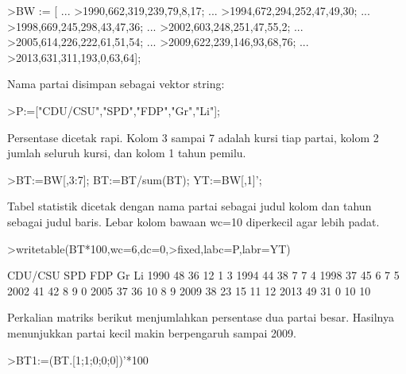 \documentclass[a4paper,10pt]{article}
\begin{document}
\begin{eulernotebook}
\begin{eulercomment}
\begin{eulercomment}
\begin{eulercomment}
\begin{eulercomment}
\begin{eulercomment}
\begin{eulercomment}
\begin{eulercomment}
\begin{eulercomment}
\begin{eulercomment}
\begin{eulercomment}
\begin{eulercomment}
\begin{eulercomment}
\begin{eulercomment}
\begin{eulercomment}
\begin{eulercomment}
\end{eulercomment}
\begin{eulercomment}
\end{eulercomment}
\begin{eulerprompt}
>BW := [ ...
>1990,662,319,239,79,8,17; ...
>1994,672,294,252,47,49,30; ...
>1998,669,245,298,43,47,36; ...
>2002,603,248,251,47,55,2; ...
>2005,614,226,222,61,51,54; ...
>2009,622,239,146,93,68,76; ...
>2013,631,311,193,0,63,64];
\end{eulerprompt}
\begin{eulercomment}
Nama partai disimpan sebagai vektor string:
\end{eulercomment}
\begin{eulerprompt}
>P:=["CDU/CSU","SPD","FDP","Gr","Li"];
\end{eulerprompt}
\begin{eulercomment}
Persentase dicetak rapi. Kolom 3 sampai 7 adalah kursi tiap partai, kolom 2 jumlah seluruh
kursi, dan kolom 1 tahun pemilu.
\end{eulercomment}
\begin{eulerprompt}
>BT:=BW[,3:7]; BT:=BT/sum(BT); YT:=BW[,1]';
\end{eulerprompt}
\begin{eulercomment}
Tabel statistik dicetak dengan nama partai sebagai judul kolom dan tahun sebagai judul
baris. Lebar kolom bawaan wc=10 diperkecil agar lebih padat.
\end{eulercomment}
\begin{eulerprompt}
>writetable(BT*100,wc=6,dc=0,>fixed,labc=P,labr=YT)
\end{eulerprompt}
\begin{euleroutput}
         CDU/CSU   SPD   FDP    Gr    Li
    1990      48    36    12     1     3
    1994      44    38     7     7     4
    1998      37    45     6     7     5
    2002      41    42     8     9     0
    2005      37    36    10     8     9
    2009      38    23    15    11    12
    2013      49    31     0    10    10
\end{euleroutput}
\begin{eulercomment}
Perkalian matriks berikut menjumlahkan persentase dua partai besar. Hasilnya menunjukkan
partai kecil makin berpengaruh sampai 2009.
\end{eulercomment}
\begin{eulerprompt}
>BT1:=(BT.[1;1;0;0;0])'*100
\end{eulerprompt}
\begin{euleroutput}

\end{euleroutput}
\end{eulercomment}
\end{eulercomment}
\end{eulercomment}
\end{eulercomment}
\end{eulercomment}
\end{eulercomment}
\end{eulercomment}
\end{eulercomment}
\end{eulercomment}
\end{eulercomment}
\end{eulercomment}
\end{eulercomment}
\end{eulercomment}
\end{eulercomment}
\end{eulernotebook}
\end{document}
